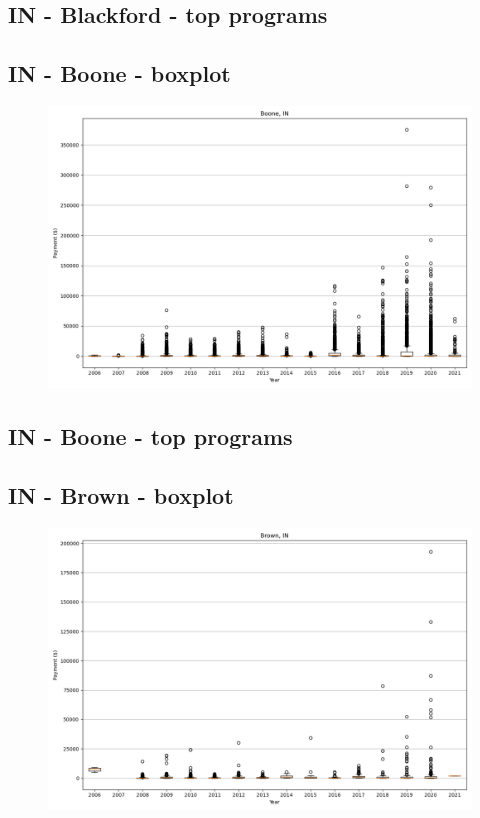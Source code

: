 \subsection*{IN - Blackford - top programs}

\newpage
\subsection*{IN - Boone - boxplot}
\begin{figure}[h]
\centering
\includegraphics[width=7in]{../output/boxplots/counties/Boone-IN_boxplot.png}
\end{figure}


\subsection*{IN - Boone - top programs}

\newpage
\subsection*{IN - Brown - boxplot}
\begin{figure}[h]
\centering
\includegraphics[width=7in]{../output/boxplots/counties/Brown-IN_boxplot.png}
\end{figure}


